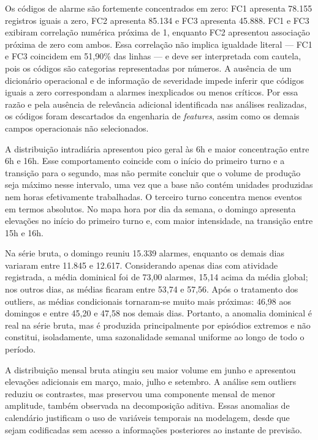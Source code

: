 Os códigos de alarme são fortemente concentrados em zero: FC1 apresenta 78.155 registros iguais a zero, FC2 apresenta 85.134 e FC3 apresenta 45.888. FC1 e FC3 exibiram correlação numérica próxima de 1, enquanto FC2 apresentou associação próxima de zero com ambos. Essa correlação não implica igualdade literal --- FC1 e FC3 coincidem em 51,90\% das linhas --- e deve ser interpretada com cautela, pois os códigos são categorias representadas por números. A ausência de um dicionário operacional e de informação de severidade impede inferir que códigos iguais a zero correspondam a alarmes inexplicados ou menos críticos. Por essa razão e pela ausência de relevância adicional identificada nas análises realizadas, os códigos foram descartados da engenharia de \textit{features}, assim como os demais campos operacionais não selecionados.

A distribuição intradiária apresentou pico geral às 6h e maior concentração entre 6h e 16h. Esse comportamento coincide com o início do primeiro turno e a transição para o segundo, mas não permite concluir que o volume de produção seja máximo nesse intervalo, uma vez que a base não contém unidades produzidas nem horas efetivamente trabalhadas. O terceiro turno concentra menos eventos em termos absolutos. No mapa hora por dia da semana, o domingo apresenta elevações no início do primeiro turno e, com maior intensidade, na transição entre 15h e 16h.

Na série bruta, o domingo reuniu 15.339 alarmes, enquanto os demais dias variaram entre 11.845 e 12.617. Considerando apenas dias com atividade registrada, a média dominical foi de 73,00 alarmes, 15,14 acima da média global; nos outros dias, as médias ficaram entre 53,74 e 57,56. Após o tratamento dos outliers, as médias condicionais tornaram-se muito mais próximas: 46,98 aos domingos e entre 45,20 e 47,58 nos demais dias. Portanto, a anomalia dominical é real na série bruta, mas é produzida principalmente por episódios extremos e não constitui, isoladamente, uma sazonalidade semanal uniforme ao longo de todo o período.

A distribuição mensal bruta atingiu seu maior volume em junho e apresentou elevações adicionais em março, maio, julho e setembro. A análise sem outliers reduziu os contrastes, mas preservou uma componente mensal de menor amplitude, também observada na decomposição aditiva. Essas anomalias de calendário justificam o uso de variáveis temporais na modelagem, desde que sejam codificadas sem acesso a informações posteriores ao instante de previsão.


